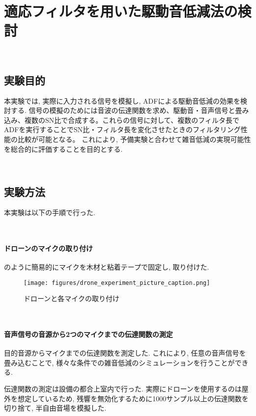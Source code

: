 \
\chapter{適応フィルタを用いた駆動音低減法の検討}\label{adf-practice}

\
\section{実験目的}\label{purpose-practice}

本実験では, 実際に入力される信号を模擬し, ADFによる駆動音低減の効果を検討する. 信号の模擬のためには音波の伝達関数を求め、駆動音・音声信号と畳み込み、複数のSN比で合成する。これらの信号に対して、複数のフィルタ長でADFを実行することでSN比・フィルタ長を変化させたときのフィルタリング性能の比較が可能となる。
これにより, 予備実験と合わせて雑音低減の実現可能性を総合的に評価することを目的とする. 

\
\section{実験方法}\label{instruction-practice}

本実験は以下の手順で行った. 

\
\subsubsection{ドローンのマイクの取り付け}\label{installment-mic}

のように簡易的にマイクを木材と粘着テープで固定し, 取り付けた. 

\begin{figure}[H]
\centering
\texttt{[image: figures/drone\_experiment\_picture\_caption.png]}
\caption{ドローンと各マイクの取り付け}
\label{fig:drone_experiment}
\end{figure}

\
\subsubsection{音声信号の音源から2つのマイクまでの伝達関数の測定}\label{observation-tf}

目的音源からマイクまでの伝達関数を測定した. これにより, 任意の音声信号を畳み込むことで, 様々な条件での雑音低減のシミュレーションを行うことができる. 

伝達関数の測定は設備の都合上室内で行った. 実際にドローンを使用するのは屋外を想定しているため, 残響を無効化するために1000サンプル以上の伝達関数を切り捨て, 半自由音場を模擬した. 

